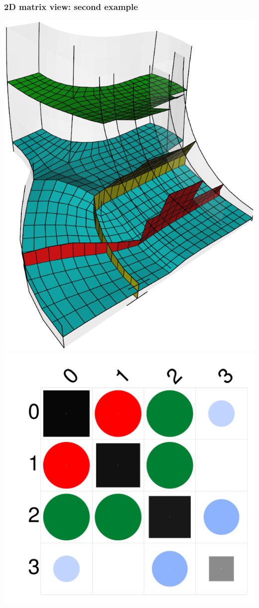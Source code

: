 \documentclass[12pt]{beamer}
\begin{document}
\begin{frame}[fragile]
\begin{center}
  \end{center}
\end{frame}
\begin{frame}[fragile]
  \frametitle{2D matrix view: second example}
  \begin{center}
  \includegraphics[height=0.9\textheight]{./images/vis-2d-ex2-sheets.png}
  \includegraphics[height=0.5\textheight]{./images/vis-2d-ex2-matrix.png}

\end{center}
\end{frame}
\end{document}

